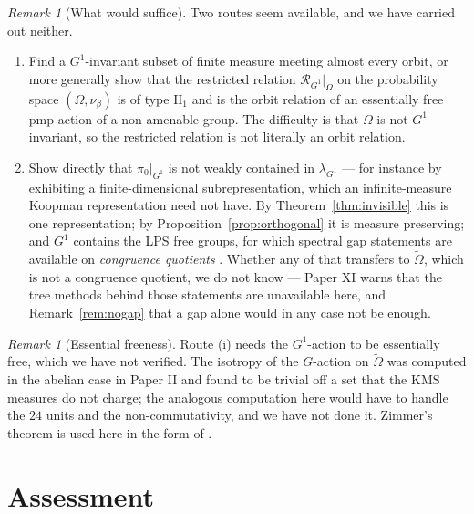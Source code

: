 \documentclass[11pt]{amsart}
\numberwithin{equation}{section}
\theoremstyle{definition}
\theoremstyle{remark}
\newtheorem{remark}[theorem]{Remark}
\begin{document}
\begin{remark}[What would suffice]\label{rem:suffice}
Two routes seem available, and we have carried out neither.
\begin{enumerate}
\item Find a $G^1$-invariant subset of finite measure meeting almost every orbit, or more
generally show that the restricted relation $\mathcal R_{G^1}|_\Omega$ on the probability
space $(\Omega,\nu_\beta)$ is of type $\mathrm{II}_1$ and is the orbit relation of an
essentially free pmp action of a non-amenable group. The difficulty is that $\Omega$ is not
$G^1$-invariant, so the restricted relation is not literally an orbit relation.
\item Show directly that $\pi_0|_{G^1}$ is not weakly contained in $\lambda_{G^1}$ --- for
instance by exhibiting a finite-dimensional subrepresentation, which an infinite-measure
Koopman representation need not have. By Theorem~\ref{thm:invisible} this is one
representation; by Proposition~\ref{prop:orthogonal} it is measure preserving; and $G^1$
contains the LPS free groups, for which spectral gap statements are available on
\emph{congruence quotients} \cite{LPS}. Whether any of that transfers to $\widetilde\Omega$,
which is not a congruence quotient, we do not know --- Paper XI warns that the tree methods
behind those statements are unavailable here, and Remark~\ref{rem:nogap} that a gap alone
would in any case not be enough.
\end{enumerate}
\end{remark}

\begin{remark}[Essential freeness]\label{rem:free}
Route (i) needs the $G^1$-action to be essentially free, which we have not verified. The
isotropy of the $G$-action on $\widetilde\Omega$ was computed in the abelian case in Paper II
and found to be trivial off a set that the $\mathrm{KMS}$ measures do not charge; the
analogous computation here would have to handle the $24$ units and the non-commutativity,
and we have not done it. Zimmer's theorem is used here in the form of \cite[Ch.~4]{Zimmer}.
\end{remark}

\section{Assessment}
\end{document}
